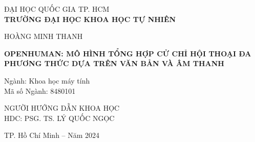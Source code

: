 \pagebreak

\begin{mdframed}[linewidth=1pt, 
	linecolor=black, 
	innerleftmargin=10mm, 
	innerrightmargin=10mm, 
	innertopmargin=10mm, 
	innerbottommargin=10mm]
	\centering
	\vspace*{1cm}
	
	\Large ĐẠI HỌC QUỐC GIA TP. HCM\\
	\vspace{0.25cm}
	\Large \textbf{TRƯỜNG ĐẠI HỌC KHOA HỌC TỰ NHIÊN}\\
	
	\vspace{2cm}
	
	\Large HOÀNG MINH THANH \\
	
	\vspace{3cm}
	
	\Large \textbf{\MakeUppercase{OPENHUMAN: MÔ HÌNH TỔNG HỢP CỬ CHỈ HỘI THOẠI ĐA PHƯƠNG THỨC DỰA TRÊN VĂN BẢN VÀ ÂM THANH}}\\
	
	\vspace{1cm}
	
	\flushleft
	{\fontsize{13}{15}\selectfont Ngành: Khoa học máy tính}\\
	{\fontsize{13}{15}\selectfont Mã số Ngành: 8480101}\\
	
	\vspace{3cm}
	
	\centering
	\Large NGƯỜI HƯỚNG DẪN KHOA HỌC\\
	\Large HDC: PSG. TS. LÝ QUỐC NGỌC \\
	
	\vfill
	\vspace{3cm}
	
	{\fontsize{12}{13} TP. Hồ Chí Minh – Năm 2024}
\end{mdframed}



\pagebreak
{}


\pagebreak

